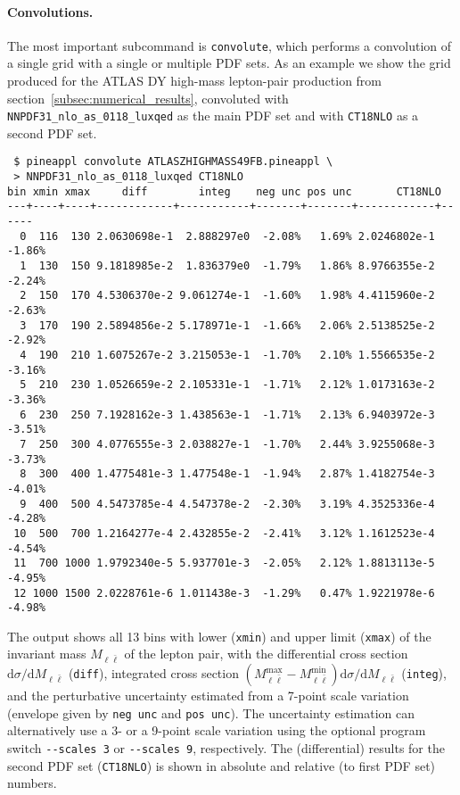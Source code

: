 \paragraph{Convolutions.}
The most important subcommand is \texttt{convolute}, which performs a convolution of a single grid with a single or multiple PDF sets.
As an example we show the grid produced for the ATLAS DY high-mass lepton-pair production from section~\ref{subsec:numerical_results}, convoluted with \texttt{NNPDF31\_nlo\_as\_0118\_luxqed} as the main PDF set and with \texttt{CT18NLO} as a second PDF set.
\begin{verbatim}
 $ pineappl convolute ATLASZHIGHMASS49FB.pineappl \
 > NNPDF31_nlo_as_0118_luxqed CT18NLO
bin xmin xmax     diff        integ    neg unc pos unc       CT18NLO
---+----+----+------------+-----------+-------+-------+------------+------
  0  116  130 2.0630698e-1  2.888297e0  -2.08%   1.69% 2.0246802e-1 -1.86%
  1  130  150 9.1818985e-2  1.836379e0  -1.79%   1.86% 8.9766355e-2 -2.24%
  2  150  170 4.5306370e-2 9.061274e-1  -1.60%   1.98% 4.4115960e-2 -2.63%
  3  170  190 2.5894856e-2 5.178971e-1  -1.66%   2.06% 2.5138525e-2 -2.92%
  4  190  210 1.6075267e-2 3.215053e-1  -1.70%   2.10% 1.5566535e-2 -3.16%
  5  210  230 1.0526659e-2 2.105331e-1  -1.71%   2.12% 1.0173163e-2 -3.36%
  6  230  250 7.1928162e-3 1.438563e-1  -1.71%   2.13% 6.9403972e-3 -3.51%
  7  250  300 4.0776555e-3 2.038827e-1  -1.70%   2.44% 3.9255068e-3 -3.73%
  8  300  400 1.4775481e-3 1.477548e-1  -1.94%   2.87% 1.4182754e-3 -4.01%
  9  400  500 4.5473785e-4 4.547378e-2  -2.30%   3.19% 4.3525336e-4 -4.28%
 10  500  700 1.2164277e-4 2.432855e-2  -2.41%   3.12% 1.1612523e-4 -4.54%
 11  700 1000 1.9792340e-5 5.937701e-3  -2.05%   2.12% 1.8813113e-5 -4.95%
 12 1000 1500 2.0228761e-6 1.011438e-3  -1.29%   0.47% 1.9221978e-6 -4.98%
\end{verbatim}
The output shows all 13 bins with lower (\texttt{xmin}) and upper limit (\texttt{xmax}) of the invariant mass $M_{\ell \bar{\ell}}$ of the lepton pair, with the differential cross section $\mathrm{d} \sigma / \mathrm{d} M_{\ell \bar{\ell}}$ (\texttt{diff}), integrated cross section $(M_{\ell \bar{\ell}}^\mathrm{max} - M_{\ell \bar{\ell}}^\mathrm{min}) \mathrm{d} \sigma / \mathrm{d} M_{\ell \bar{\ell}}$ (\texttt{integ}), and the perturbative uncertainty estimated from a 7-point scale variation (envelope given by \texttt{neg unc} and \texttt{pos unc}).
The uncertainty estimation can alternatively use a 3- or a 9-point scale variation using the optional program switch \texttt{-{}-scales 3} or \texttt{-{}-scales 9}, respectively.
The (differential) results for the second PDF set (\texttt{CT18NLO}) is shown in absolute and relative (to first PDF set) numbers.

